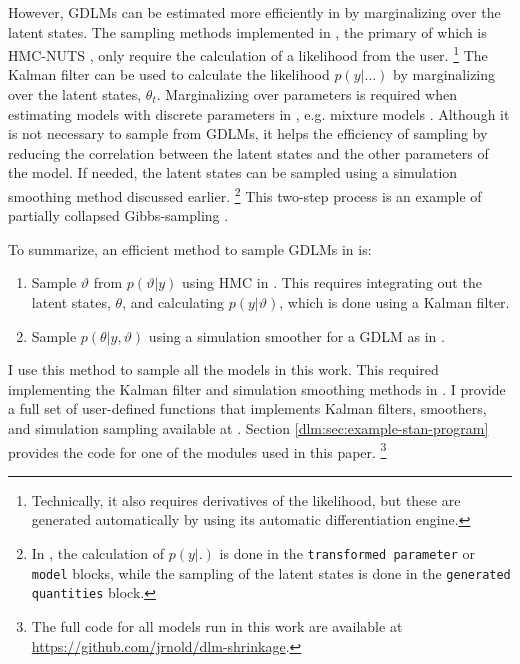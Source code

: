 However, GDLMs can be estimated more efficiently in \Stan{} by marginalizing over the latent states.
The sampling methods implemented in \Stan{}, the primary of which is HMC-NUTS \parencites{HoffmanGelman2014a}, only require the calculation of a likelihood from the user.%
\footnote{Technically, it also requires derivatives of the likelihood, but these are generated automatically by \Stan{} using its automatic differentiation engine.}
The Kalman filter can be used to calculate the likelihood $p(y | ...)$ by marginalizing over the latent states, $\theta_{t}$. 
Marginalizing over parameters is required when estimating models with discrete parameters in \Stan{}, e.g. mixture models \parencite[104]{Stan2015a}.
Although it is not necessary to sample from GDLMs, it helps the efficiency of sampling by reducing the correlation between the latent states and the other parameters of the model.%
If needed, the latent states can be sampled using a simulation smoothing method discussed earlier.%
\footnote{In \Stan{}, the calculation of $p(y| .)$ is done in the \texttt{transformed parameter} or \texttt{model} blocks, while the sampling of the latent states is done in the \texttt{generated quantities} block.}
This two-step process is an example of partially collapsed Gibbs-sampling \parencite{VanDykPark2008a}.

To summarize, an efficient method to sample GDLMs in \Stan{} is:
\begin{enumerate}
\item Sample $\vartheta$ from $p(\vartheta | y)$ using HMC in \Stan{}.
  This requires integrating out the latent states, $\theta$, and calculating $p(y | \vartheta)$, which is done using a Kalman filter.
\item Sample $p(\theta | y, \vartheta)$ using a simulation smoother for a GDLM as in  \parencites{CarterKohn1994}{Fruehwirth-Schnatter1994}{DeJongShephard1995}{DurbinKoopman2002}[Ch 4.9]{DurbinKoopman2012}.
\end{enumerate}
I use this method to sample all the models in this work.
This required implementing the Kalman filter and simulation smoothing methods in \Stan{}.
I provide a full set of user-defined \Stan{} functions that implements Kalman filters, smoothers, and simulation sampling available at \textcite{Arnold2015c}.
Section \ref{dlm:sec:example-stan-program} provides the code for one of the \Stan{} modules used in this paper.%
\footnote{The full code for all models run in this work are available at \url{https://github.com/jrnold/dlm-shrinkage}.}

